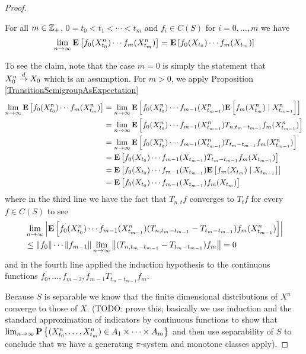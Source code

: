\begin{proof}
\begin{clm} For all $m \in \integers_+$, $0=t_0 < t_1 < \dotsb < t_m$ and $f_i \in C(S)$ for $i=0, \dotsc, m$ we have
\begin{align*}
\lim_{n \to \infty} \expectation{f_0(X^n_{t_0}) \dotsb f_m(X^n_{t_m})} = \expectation{f_0(X_{t_0}) \dotsb f_{m}(X_{t_{m}})}
\end{align*}
\end{clm}
To see the claim, note that the case $m=0$ is simply the statement that $X^n_0 \todist X_0$ which is an assumption.  For $m > 0$, 
we apply Proposition \ref{TransitionSemigroupAsExpectation}
\begin{align*}
\lim_{n \to \infty} \expectation{f_0(X^n_{t_0}) \dotsb f_m(X^n_{t_m})} 
&=\lim_{n \to \infty} \expectation{f_0(X^n_{t_0}) \dotsb f_{m-1}(X^n_{t_{m-1}}) \cexpectationlong{X^n_{t_{m-1}}}{f_m(X^n_{t_m})}} \\
&=\lim_{n \to \infty} \expectation{f_0(X^n_{t_0}) \dotsb f_{m-1}(X^n_{t_{m-1}}) T_{n,t_m-t_{m-1}} f_m(X^n_{t_{m-1}})}\\
&=\lim_{n \to \infty} \expectation{f_0(X^n_{t_0}) \dotsb f_{m-1}(X^n_{t_{m-1}}) T_{t_m-t_{m-1}} f_m(X^n_{t_{m-1}})}\\
&=\expectation{f_0(X_{t_0}) \dotsb f_{m-1}(X_{t_{m-1}}) T_{t_m-t_{m-1}} f_m(X_{t_{m-1}})}\\
&=\expectation{f_0(X_{t_0}) \dotsb f_{m-1}(X_{t_{m-1}}) \cexpectationlong{X_{t_{m-1}}}{f_m(X_{t_{m}})}}\\
&=\expectation{f_0(X_{t_0}) \dotsb f_{m-1}(X_{t_{m-1}}) f_m(X_{t_{m}})}\\
\end{align*}
where in the third line we have the fact that $T_{n,t} f$ converges to $T_t f$  for every $f \in C(S)$ to see
\begin{align*}
&\lim_{n \to \infty} \abs{\expectation{f_0(X^n_{t_0}) \dotsb f_{m-1}(X^n_{t_{m-1}}) (T_{n,t_m - t_{m-1}} - T_{t_m-t_{m-1}}) f_m(X^n_{t_{m-1}})}}  \\
&\leq \norm{f_0} \dotsb \norm{f_{m-1}} \lim_{n \to \infty} \norm{(T_{n,t_m - t_{m-1}} - T_{t_m-t_{m-1}}) f_m} = 0
\end{align*}
and in the fourth line applied the induction hypothesis to the continuous functions $f_0, \dotsc, f_{m-2}, f_{m-1} T_{t_m-t_{m-1}} f_m$.

Because $S$ is separable we know that the finite dimensional distributions of $X^n$ converge to those of $X$.  (TODO: prove this; basically we use induction and the standard approximation of indicators by continuous functions to show that $\lim_{n \to \infty} \probability{(X^n_{t_0}, \dotsc, X^n_{t_m}) \in A_1 \times \dotsb \times A_m}$ and then use separability of $S$ to conclude that we have a generating $\pi$-system and monotone classes apply).


\end{proof}
